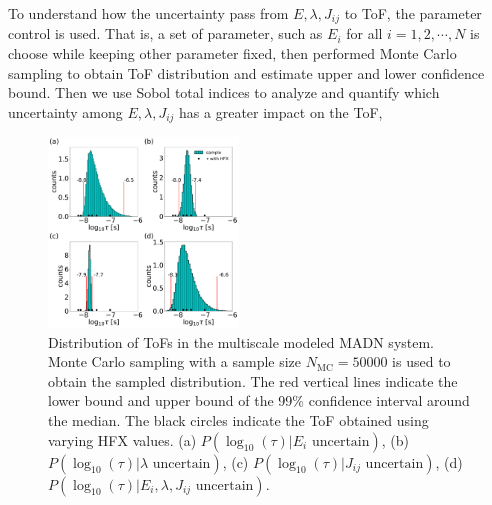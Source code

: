 \documentclass[%
 reprint,
 amsmath,amssymb,
 aps,
]{revtex4-2}
\begin{document}
To understand how the uncertainty pass from $E, \lambda, J_{ij}$ to ToF, the parameter control is used. That is, a set of parameter, such as $E_i$ for all $i=1,2,\cdots,N$ is choose while keeping other parameter fixed, then performed Monte Carlo sampling to obtain ToF distribution and estimate upper and lower confidence bound.
Then we use Sobol total indices to analyze and quantify 
which uncertainty among $E, \lambda, J_{ij}$ has a greater impact on the ToF, 

%
\begin{figure}
  \centering
  \includegraphics[width=0.45\textwidth]{figs/fig_mle_MADN_withE.pdf}
  \caption{Distribution of ToFs in the multiscale modeled MADN system.
  Monte Carlo sampling with a sample size $N_\text{MC}=50000$ is used to obtain the sampled distribution. The red vertical lines indicate the lower bound and upper bound of the 99\% confidence interval around the median.
  The black circles indicate the ToF obtained using varying HFX values.
  (a) $P(\log_{10}(\tau)|E_i \text{ uncertain})$, 
  (b) $P(\log_{10}(\tau)|\lambda \text{ uncertain})$, 
  (c) $P(\log_{10}(\tau)|J_{ij} \text{ uncertain})$, 
  (d) $P(\log_{10}(\tau)|E_i, \lambda, J_{ij} \text{ uncertain})$. }
  \label{fig:mle_MADN_withE}
\end{figure}
%
\end{document}
